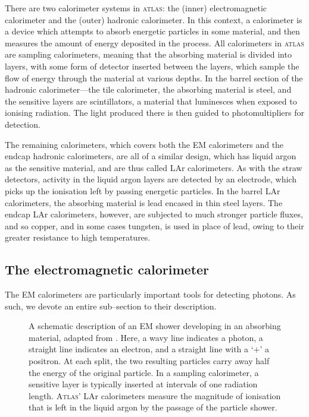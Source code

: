 There are two calorimeter systems in \textsc{atlas}: the (inner) electromagnetic calorimeter and the (outer) hadronic calorimeter. In this context, a calorimeter is a device which attempts to absorb energetic particles in some material, and then measures the amount of energy deposited in the process. All calorimeters in \textsc{atlas} are sampling calorimeters, meaning that the absorbing material is divided into layers, with some form of detector inserted between the layers, which sample the flow of energy through the material at various depths. In the barrel section of the hadronic calorimeter---the tile calorimeter, the absorbing material is steel, and the sensitive layers are scintillators, a material that luminesces when exposed to ionising radiation. The light produced there is then guided to photomultipliers for detection.

The remaining calorimeters, which covers both the EM calorimeters and the endcap hadronic calorimeters, are all of a similar design, which has liquid argon as the sensitive material, and are thus called LAr calorimeters. As with the straw detectors, activity in the liquid argon layers are detected by an electrode, which picks up the ionisation left by passing energetic particles. In the barrel LAr calorimeters, the absorbing material is lead encased in thin steel layers. The endcap LAr calorimeters, however, are subjected to much stronger particle fluxes, and so copper, and in some cases tungsten, is used in place of lead, owing to their greater resistance to high temperatures.

\subsection{The electromagnetic calorimeter}

The EM calorimeters are particularly important tools for detecting photons. As such, we devote an entire sub--section to their description.

\begin{figure}[htp]
\begin{minipage}[b]{.69\textwidth}
\begin{infilsf}\footnotesize

\end{infilsf}
\end{minipage}\hfill
\begin{minipage}[b]{.3\textwidth}
\caption{A schematic description of an EM shower developing in an absorbing material, adapted from \cite{fernow:sampcal}. Here, a wavy line indicates a photon, a straight line indicates an electron, and a straight line with a `$+$' a positron. At each split, the two resulting particles carry away half the energy of the original particle. In a sampling calorimeter, a sensitive layer is typically inserted at intervals of one radiation length. \textsc{Atlas}' LAr calorimeters measure the magnitude of ionisation that is left in the liquid argon by the passage of the particle shower.
\label{emshower}
}
\end{minipage}
\end{figure}

